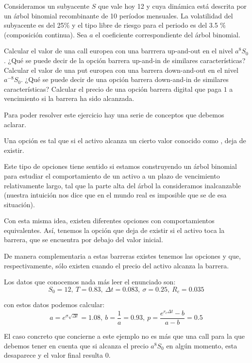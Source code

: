 \begin{problem}[2]
Consideramos un subyacente $S$ que vale hoy 12 y cuya dinámica está descrita por un árbol binomial recombinante de 10 períodos mensuales. La volatilidad del subyacente es del 25\% y el tipo libre de riesgo para el periodo es del 3.5 \% (composición continua). Sea $a$ el coeficiente correspondiente del árbol binomial.

\ppart Calcular el valor de una call europea con una barrrera up-and-out en el nivel $a^8S_0$.
\ppart ¿Qué se puede decir de la opción barrera up-and-in de similares características?
\ppart Calcular el valor de una put europea con una barrera down-and-out en el nivel $a^{-8}S_0$.
\ppart ¿Qué se puede decir de una opción barrera down-and-in de similares características?
\ppart Calcular el precio de una opción barrera digital que paga $1$ a vencimiento si la barrera ha sido alcanzada.

\solution


Para poder resolver este ejercicio hay una serie de conceptos que debemos aclarar.

Una opción  es tal que si el activo alcanza un cierto valor conocido como , deja de existir.

Este tipo de opciones tiene sentido si estamos construyendo un árbol binomial para estudiar el comportamiento de un activo a un plazo de vencimiento relativamente largo, tal que la parte alta del árbol la consideramos inalcanzable (nuestra intuición nos dice que en el mundo real es imposible que se de esa situación).

Con esta misma idea, existen diferentes opciones con comportamientos equivalentes. Así, tenemos la opción  que deja de existir si el activo toca la barrera, que se encuentra por debajo del valor inicial.

De manera complementaria a estas barreras existes tenemos las opciones  y  que, respectivamente, sólo existen cuando el precio del activo alcanza la barrera.


Los datos que conocemos nada más leer el enunciado son:
\[S_0=12, \ T=0.83, \ Δt = 0.083, \ σ=0.25, \ R_c=0.035\]

con estos datos podemos calcular:
\[a=e^{σ\sqrt{Δt}} = 1.08, \ b = \frac{1}{a} = 0.93, \ p = \frac{e^{r_cΔt}-b}{a-b}=0.5\]

\spart

El caso concreto que concierne a este ejemplo no es más que una call para la que debemos tener en cuenta que si alcanza el precio $a^8S_0$ en algún momento, esta desaparece y el valor final resulta 0.


\end{problem}
